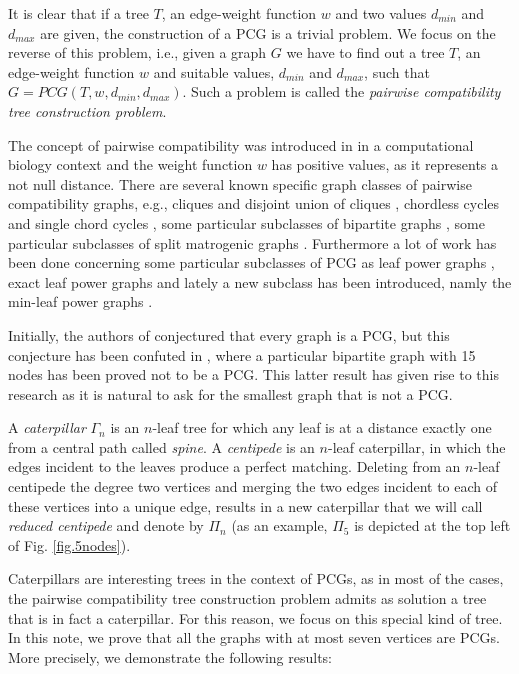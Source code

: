 \documentclass[review]{elsarticle}
\begin{document}
It is clear that if a tree $T$, an edge-weight function $w$ and two values $d_{min}$ and $d_{max}$ are given, the construction of a PCG is a trivial problem. 
We focus on the reverse of this problem, i.e., given a graph $G$ we have to find out a tree $T$, an edge-weight function $w$ and suitable values, $d_{min}$ and $d_{max}$, such that $G=PCG(T,w,d_{min}, d_{max})$. Such a problem is called the {\em pairwise compatibility tree construction problem}.  

The concept of pairwise compatibility was introduced in \cite{Kal03} in a computational biology context and the weight function $w$ has positive values, as it represents a not null distance.  There are several known specific graph classes of pairwise compatibility graphs, e.g., cliques and disjoint union of cliques \cite{B}, chordless cycles and single chord cycles \cite{YHR09}, some  particular subclasses of bipartite graphs \cite{YBR10}, some particular subclasses of split matrogenic graphs \cite{CPS12}.  Furthermore a lot of work has been done concerning some particular subclasses of PCG as leaf power graphs \cite{B}, exact leaf power graphs \cite{BLR10} and lately a new subclass has been introduced, namly the min-leaf power graphs \cite{CPS12}.

Initially, the authors of \cite{Kal03} conjectured that every graph is a PCG, but this conjecture has been confuted in \cite{YBR10}, where a particular bipartite graph with 15 nodes has been proved not to be a PCG. 
This latter result has given rise to this research as it is natural to ask for the smallest graph that is not a PCG.

\medskip

A {\em caterpillar} $\Gamma_n$ is an $n$-leaf tree for which any leaf is at a distance exactly one from a central path called {\em spine}.
A {\em centipede} is an $n$-leaf caterpillar, in which the edges incident to the leaves produce a perfect matching.
Deleting from an $n$-leaf centipede the degree two vertices and merging the two edges incident to each of these vertices into a unique edge, results in a new caterpillar that we will call {\em reduced centipede} and denote by $\Pi_n$  (as an example, $\Pi_5$ is depicted at the top left of  Fig. \ref{fig.5nodes}).

Caterpillars are interesting trees in the context of PCGs, as in most of the cases, the pairwise compatibility tree construction problem admits as solution a tree that is in fact a caterpillar.
For this reason, we focus on this special kind of tree.
In this note, we prove that all the graphs with at most seven vertices are PCGs. More precisely, we demonstrate the following results:
\end{document}

